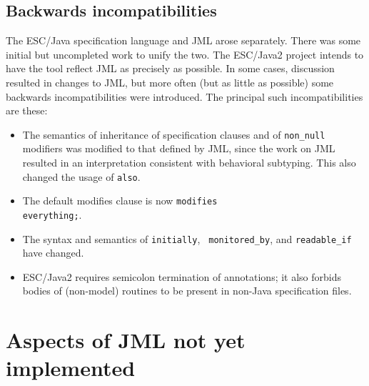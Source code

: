 \documentclass{acm_proc_article-sp}
\begin{document}
\subsection{Backwards incompatibilities}
The ESC/Java specification language and JML arose separately.  There
was some initial but uncompleted work to unify the two.  The ESC/Java2
project intends to have the tool reflect JML as precisely as possible.
In some cases, discussion resulted in changes to JML, but more often
(but as little as possible) some backwards incompatibilities were
introduced.  The principal such incompatibilities are these:
\setlength{\partopsep}{0in}\setlength{\parskip}{0in}
\begin{itemize}\setlength{\itemsep}{0in}
\item The semantics of inheritance of specification clauses and of
  {\tt non\_null} modifiers was modified to that defined by JML, since
  the work on JML resulted in an interpretation consistent with
  behavioral subtyping.  This also changed the usage of {\tt also}.
\item The default modifies clause is now {\tt modifies \\everything;}.
\item The syntax and semantics of {\tt initially}, {\tt
    monitored\_by}, and {\tt readable\_if} have changed.
\item ESC/Java2 requires semicolon termination of annotations; it also
  forbids bodies of (non-model) routines to be present in non-Java
  specification files.
\end{itemize}

\section{Aspects of JML not yet implemented}
\end{document}
